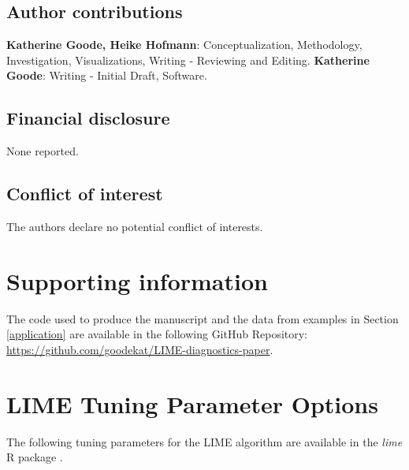 \documentclass[AMS,STIX2COL]{WileyNJD-v2}\usepackage[]{graphicx}\usepackage[]{color}
\begin{document}
\subsection*{Author contributions}

{\bf Katherine Goode, Heike Hofmann}: Conceptualization, Methodology, Investigation, Visualizations, Writing - Reviewing and Editing. {\bf Katherine Goode}: Writing - Initial Draft, Software.

\subsection*{Financial disclosure}

None reported.

\subsection*{Conflict of interest}

The authors declare no potential conflict of interests.

\section*{Supporting information}

The code used to produce the manuscript and the data from examples in Section \ref{application} are available in the following GitHub Repository: \href{https://github.com/goodekat/LIME-diagnostics-paper}{https://github.com/goodekat/LIME-diagnostics-paper}.



\newpage

\appendix

\section{LIME Tuning Parameter Options} \label{lime-details}

The following tuning parameters for the LIME algorithm are available in the \emph{lime} R package \citep{pedersen:2020}.
\end{document}
